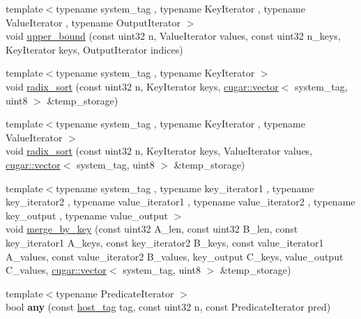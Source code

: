\begin{DoxyCompactItemize}
\item 
{\footnotesize template$<$typename system\+\_\+tag , typename Key\+Iterator , typename Value\+Iterator , typename Output\+Iterator $>$ }\\void \hyperlink{group___primitives_ga56b7c8a32a7a8a42afe413b087159230}{upper\+\_\+bound} (const uint32 n, Value\+Iterator values, const uint32 n\+\_\+keys, Key\+Iterator keys, Output\+Iterator indices)
\item 
{\footnotesize template$<$typename system\+\_\+tag , typename Key\+Iterator $>$ }\\void \hyperlink{group___primitives_gac4584fb9407d3d12ff3a4a1890e9b903}{radix\+\_\+sort} (const uint32 n, Key\+Iterator keys, \hyperlink{structcugar_1_1vector}{cugar\+::vector}$<$ system\+\_\+tag, uint8 $>$ \&temp\+\_\+storage)
\item 
{\footnotesize template$<$typename system\+\_\+tag , typename Key\+Iterator , typename Value\+Iterator $>$ }\\void \hyperlink{group___primitives_ga5b655f3d4ce7cf922eaf9ed446ab426b}{radix\+\_\+sort} (const uint32 n, Key\+Iterator keys, Value\+Iterator values, \hyperlink{structcugar_1_1vector}{cugar\+::vector}$<$ system\+\_\+tag, uint8 $>$ \&temp\+\_\+storage)
\item 
{\footnotesize template$<$typename system\+\_\+tag , typename key\+\_\+iterator1 , typename key\+\_\+iterator2 , typename value\+\_\+iterator1 , typename value\+\_\+iterator2 , typename key\+\_\+output , typename value\+\_\+output $>$ }\\void \hyperlink{group___primitives_gadbc27f73bf0312243aed32fc5610ac0d}{merge\+\_\+by\+\_\+key} (const uint32 A\+\_\+len, const uint32 B\+\_\+len, const key\+\_\+iterator1 A\+\_\+keys, const key\+\_\+iterator2 B\+\_\+keys, const value\+\_\+iterator1 A\+\_\+values, const value\+\_\+iterator2 B\+\_\+values, key\+\_\+output C\+\_\+keys, value\+\_\+output C\+\_\+values, \hyperlink{structcugar_1_1vector}{cugar\+::vector}$<$ system\+\_\+tag, uint8 $>$ \&temp\+\_\+storage)
\item 
\mbox{\label{namespacecugar_afc0760af9df676fffe1843d5da14bb46}} 
{\footnotesize template$<$typename Predicate\+Iterator $>$ }\\bool {\bfseries any} (const \hyperlink{structcugar_1_1host__tag}{host\+\_\+tag} tag, const uint32 n, const Predicate\+Iterator pred)
\item 
\mbox{\label{namespacecugar_ad1fde0ab6b11bcd55631f414b0825184}} 

\end{DoxyCompactItemize}
